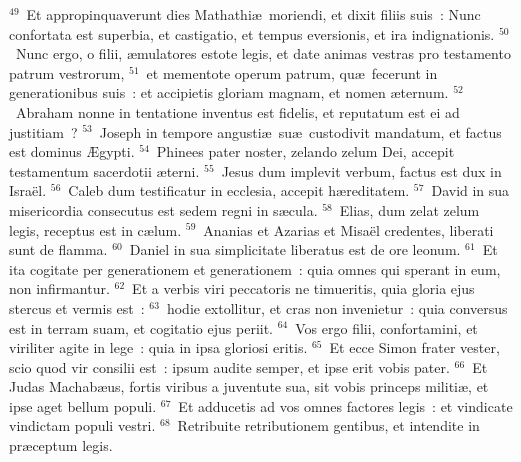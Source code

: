 ${}^{49}$~Et appropinquaverunt dies Mathathi\ae\ moriendi, et dixit filiis suis~: Nunc confortata est superbia, et castigatio, et tempus eversionis, et ira indignationis.
${}^{50}$~Nunc ergo, o filii, \ae mulatores estote legis, et date animas vestras pro testamento patrum vestrorum,
${}^{51}$~et mementote operum patrum, qu\ae\ fecerunt in generationibus suis~: et accipietis gloriam magnam, et nomen \ae ternum.
${}^{52}$~Abraham nonne in tentatione inventus est fidelis, et reputatum est ei ad justitiam~?
${}^{53}$~Joseph in tempore angusti\ae\ su\ae\ custodivit mandatum, et factus est dominus \AE gypti.
${}^{54}$~Phinees pater noster, zelando zelum Dei, accepit testamentum sacerdotii \ae terni.
${}^{55}$~Jesus dum implevit verbum, factus est dux in Isra\"el.
${}^{56}$~Caleb dum testificatur in ecclesia, accepit h\ae reditatem.
${}^{57}$~David in sua misericordia consecutus est sedem regni in s\ae cula.
${}^{58}$~Elias, dum zelat zelum legis, receptus est in c\ae lum.
${}^{59}$~Ananias et Azarias et Misa\"el credentes, liberati sunt de flamma.
${}^{60}$~Daniel in sua simplicitate liberatus est de ore leonum.
${}^{61}$~Et ita cogitate per generationem et generationem~: quia omnes qui sperant in eum, non infirmantur.
${}^{62}$~Et a verbis viri peccatoris ne timueritis, quia gloria ejus stercus et vermis est~:
${}^{63}$~hodie extollitur, et cras non invenietur~: quia conversus est in terram suam, et cogitatio ejus periit.
${}^{64}$~Vos ergo filii, confortamini, et viriliter agite in lege~: quia in ipsa gloriosi eritis.
${}^{65}$~Et ecce Simon frater vester, scio quod vir consilii est~: ipsum audite semper, et ipse erit vobis pater.
${}^{66}$~Et Judas Machab\ae us, fortis viribus a juventute sua, sit vobis princeps militi\ae , et ipse aget bellum populi.
${}^{67}$~Et adducetis ad vos omnes factores legis~: et vindicate vindictam populi vestri.
${}^{68}$~Retribuite retributionem gentibus, et intendite in pr\ae ceptum legis.


